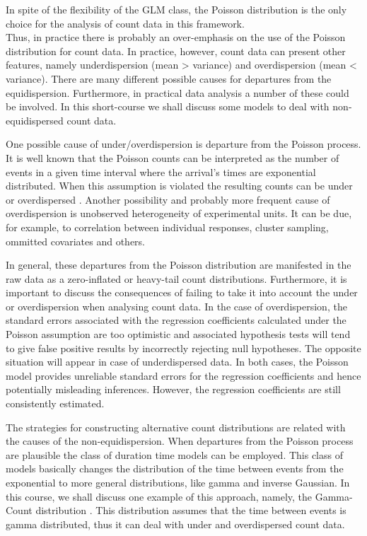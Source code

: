 \documentclass[9pt,a5paper,]{book}
\begin{document}
In spite of the flexibility of the GLM class, the Poisson distribution
is the only choice for the analysis of count data in this framework.\\
Thus, in practice there is probably an over-emphasis on the use of the
Poisson distribution for count data. In practice, however, count data
can present other features, namely underdispersion (mean \textgreater{}
variance) and overdispersion (mean \textless{} variance). There are many
different possible causes for departures from the equidispersion.
Furthermore, in practical data analysis a number of these could be
involved. In this short-course we shall discuss some models to deal with
non-equidispersed count data.

One possible cause of under/overdispersion is departure from the Poisson
process. It is well known that the Poisson counts can be interpreted as
the number of events in a given time interval where the arrival's times
are exponential distributed. When this assumption is violated the
resulting counts can be under or overdispersed \citep{Zeviani2014}.
Another possibility and probably more frequent cause of overdispersion
is unobserved heterogeneity of experimental units. It can be due, for
example, to correlation between individual responses, cluster sampling,
ommitted covariates and others.

In general, these departures from the Poisson distribution are
manifested in the raw data as a zero-inflated or heavy-tail count
distributions. Furthermore, it is important to discuss the consequences
of failing to take it into account the under or overdispersion when
analysing count data. In the case of overdispersion, the standard errors
associated with the regression coefficients calculated under the Poisson
assumption are too optimistic and associated hypothesis tests will tend
to give false positive results by incorrectly rejecting null hypotheses.
The opposite situation will appear in case of underdispersed data. In
both cases, the Poisson model provides unreliable standard errors for
the regression coefficients and hence potentially misleading inferences.
However, the regression coefficients are still consistently estimated.

The strategies for constructing alternative count distributions are
related with the causes of the non-equidispersion. When departures from
the Poisson process are plausible the class of duration time models
\citep{Winkelmann2003} can be employed. This class of models basically
changes the distribution of the time between events from the exponential
to more general distributions, like gamma and inverse Gaussian. In this
course, we shall discuss one example of this approach, namely, the
Gamma-Count distribution \citep{Zeviani2014}. This distribution assumes
that the time between events is gamma distributed, thus it can deal with
under and overdispersed count data.
\end{document}
